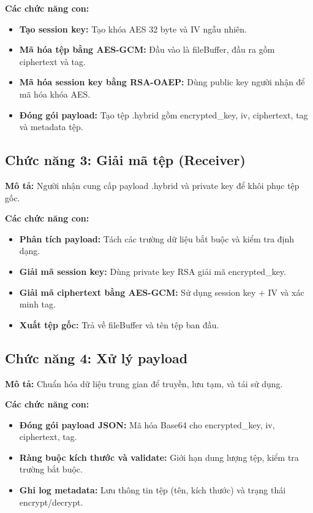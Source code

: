 \documentclass{article}
\begin{document}
\textbf{Các chức năng con:}
\begin{itemize}
	\item \textbf{Tạo session key:} Tạo khóa AES 32 byte và IV ngẫu nhiên.
	\item \textbf{Mã hóa tệp bằng AES-GCM:} Đầu vào là fileBuffer, đầu ra gồm ciphertext và tag.
	\item \textbf{Mã hóa session key bằng RSA-OAEP:} Dùng public key người nhận để mã hóa khóa AES.
	\item \textbf{Đóng gói payload:} Tạo tệp .hybrid gồm encrypted\_key, iv, ciphertext, tag và metadata tệp.
\end{itemize}

\subsection{Chức năng 3: Giải mã tệp (Receiver)}
\textbf{Mô tả:} Người nhận cung cấp payload .hybrid và private key để khôi phục tệp gốc.

\textbf{Các chức năng con:}
\begin{itemize}
	\item \textbf{Phân tích payload:} Tách các trường dữ liệu bắt buộc và kiểm tra định dạng.
	\item \textbf{Giải mã session key:} Dùng private key RSA giải mã encrypted\_key.
	\item \textbf{Giải mã ciphertext bằng AES-GCM:} Sử dụng session key + IV và xác minh tag.
	\item \textbf{Xuất tệp gốc:} Trả về fileBuffer và tên tệp ban đầu.
\end{itemize}

\subsection{Chức năng 4: Xử lý payload}
\textbf{Mô tả:} Chuẩn hóa dữ liệu trung gian để truyền, lưu tạm, và tái sử dụng.

\textbf{Các chức năng con:}
\begin{itemize}
	\item \textbf{Đóng gói payload JSON:} Mã hóa Base64 cho encrypted\_key, iv, ciphertext, tag.
	\item \textbf{Ràng buộc kích thước và validate:} Giới hạn dung lượng tệp, kiểm tra trường bắt buộc.
	\item \textbf{Ghi log metadata:} Lưu thông tin tệp (tên, kích thước) và trạng thái encrypt/decrypt.
\end{itemize}
\end{document}
